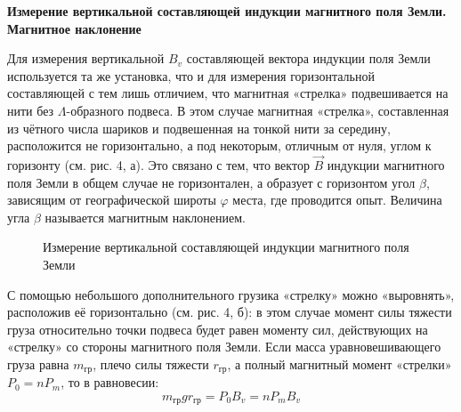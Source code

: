 \documentclass[14pt]{article}
\begin{document}
\vspace{1cm}
\textbf{Измерение вертикальной составляющей индукции магнитного поля Земли. Магнитное наклонение}

Для измерения вертикальной $B_v$ составляющей вектора индукции поля Земли используется та же установка, что и для измерения горизонтальной составляющей с тем лишь отличием,
что магнитная «стрелка» подвешивается на нити без $\Lambda$-образного подвеса. В этом случае магнитная «стрелка», составленная из чётного числа шариков и подвешенная на тонкой нити за середину, расположится не горизонтально, а под некоторым, отличным от нуля, углом к горизонту (см. рис. 4, а). Это связано с тем, что вектор $\vec{B}$ индукции магнитного поля Земли в общем случае не горизонтален, а образует с горизонтом угол $\beta$, зависящим от географической широты $\varphi$ места, где проводится опыт. Величина угла $\beta$ называется магнитным наклонением.

\begin{figure}[h!]
	\caption{Измерение вертикальной составляющей индукции магнитного поля Земли}
	\label{fig:image}
\end{figure}

С помощью небольшого дополнительного грузика «стрелку» можно «выровнять», расположив её горизонтально (см. рис. 4, б): в этом случае момент силы тяжести груза относительно
точки подвеса будет равен моменту сил, действующих на «стрелку» со стороны магнитного поля Земли. Если масса уравновешивающего груза равна $m_\text{гр}$, плечо силы тяжести $r_\text{гр}$, а полный магнитный момент «стрелки» $P_0 = nP_m$, то в равновесии:
$$
	m_\text{гр}gr_\text{гр} = P_0B_v = nP_mB_v
$$
\end{document}
